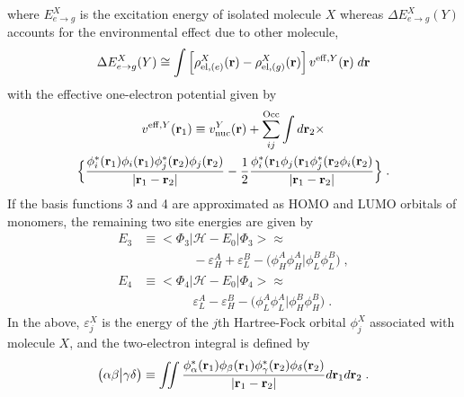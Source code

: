 %
where $E^X_{e\rightarrow g}$ is the excitation energy of isolated molecule $X$ whereas 
$\Delta E^X_{e\rightarrow g}(Y)$ accounts for the environmental effect due to other molecule,
%
\begin{equation}
 \Delta E^X_{e\rightarrow g}(Y) \cong \int \left[ \rho^{X}_{{\rm el},(e)}({\bf r}) - \rho^{X}_{{\rm el},(g)}({\bf r}) \right]
         v^{{\rm eff},Y}({\bf r}) \; d{\bf r}
\end{equation}
%
with the effective one\hyp{}electron potential given by
%
\begin{multline}
 v^{{\rm eff},Y}({\bf r}_1) \equiv v^{Y}_{\rm nuc}({\bf r})
  + \sum_{ij}^{\rm Occ} \int d{\bf r}_2 \times \\
 \Big\{
 \frac{\phi_i^*({\bf r}_1) \phi_i({\bf r}_1)
                    \phi_j^*({\bf r}_2) \phi_j({\bf r}_2)}{\vert {\bf r}_1 - {\bf r}_2 \vert}
  - \frac{1}{2}
   \frac{\phi_i^*({\bf r}_1 \phi_j({\bf r}_1 
                 \phi_j^*({\bf r}_2 \phi_i({\bf r}_2)}{\vert {\bf r}_1 - {\bf r}_2 \vert}
  \Big\} \;.
\end{multline}
%
If the basis functions 3 and 4 are approximated as HOMO and LUMO orbitals of monomers,
the remaining two site energies are given by
%
\begin{subequations}
\begin{align}
 E_3 &\equiv \big< \Phi_3 \big| \mathscr{H} -E_{0} \big| \Phi_3 \big> \approx \nonumber \\ 
 &\qquad\qquad -\varepsilon_H^A + \varepsilon_L^B - \big( \phi_H^A \phi_H^A \big| \phi_L^B \phi_L^B \big)  \;, \\
 E_4 &\equiv \big< \Phi_4 \big| \mathscr{H} -E_{0} \big| \Phi_4 \big> \approx \nonumber \\
 &\qquad\qquad \varepsilon_L^A - \varepsilon_H^B - \big( \phi_L^A \phi_L^A \big| \phi_H^B \phi_H^B \big)  \;.
\end{align}
\end{subequations}
%
In the above, $\varepsilon_j^X$ is the energy of the $j$th Hartree-Fock orbital $\phi_j^X$ associated with molecule $X$,
and the two\hyp{}electron integral is defined by
%
\begin{equation}
	\bigl( {\alpha\beta} \bigl\lvert {\gamma\delta} \bigr) \equiv
	\iint 
	\frac{ \phi_\alpha^{*}({\bf r}_1) \phi_\beta({\bf r}_1) 
	       \phi_\gamma^{*}({\bf r}_2) \phi_\delta({\bf r}_2) }{ \vert {\bf r}_1 - {\bf r}_2 \vert}
	d{\bf r}_1 d{\bf r}_2  \;.
\end{equation}
%

